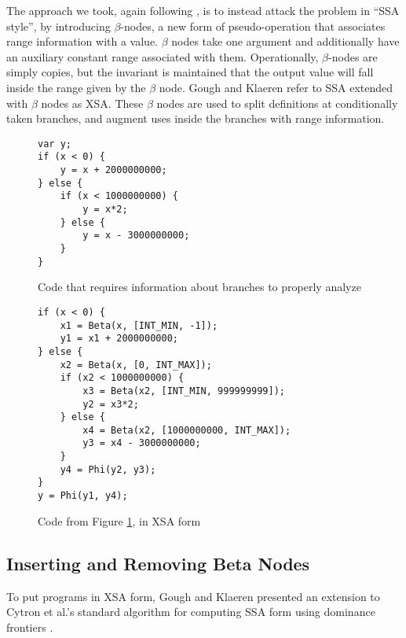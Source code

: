 \documentclass{article}
\begin{document}
The approach we took, again following \cite{Gough94eliminatingrange},
is to instead attack the problem in ``SSA style'', by introducing
$\beta$-nodes, a new form of pseudo-operation that associates range
information with a value. $\beta$ nodes take one argument and
additionally have an auxiliary constant range associated with
them. Operationally, $\beta$-nodes are simply copies, but the
invariant is maintained that the output value will fall inside the
range given by the $\beta$ node. Gough and Klaeren refer to SSA
extended with $\beta$ nodes as XSA. These $\beta$ nodes are used to split
definitions at conditionally taken branches, and augment uses inside the
branches with range information.

\begin{figure}[ht]
\begin{center}
\begin{verbatim}
var y;
if (x < 0) {
    y = x + 2000000000;
} else {
    if (x < 1000000000) {
        y = x*2;
    } else {
        y = x - 3000000000;
    }
}
\end{verbatim}
\end{center}
\caption{Code that requires information about branches to properly analyze}
\label{fig:branch}
\end{figure}

\begin{figure}[ht]
\begin{center}
\begin{verbatim}
if (x < 0) {
    x1 = Beta(x, [INT_MIN, -1]);
    y1 = x1 + 2000000000;
} else {
    x2 = Beta(x, [0, INT_MAX]);
    if (x2 < 1000000000) {
        x3 = Beta(x2, [INT_MIN, 999999999]);
        y2 = x3*2;
    } else {
        x4 = Beta(x2, [1000000000, INT_MAX]);
        y3 = x4 - 3000000000;
    }
    y4 = Phi(y2, y3);
}
y = Phi(y1, y4);
\end{verbatim}
\end{center}
\caption{Code from Figure \ref{fig:branch}, in XSA form}
\label{fig:xsa}
\end{figure}

\subsection{Inserting and Removing Beta Nodes}
To put programs in XSA form, Gough and Klaeren presented an extension
to Cytron et al.'s standard algorithm for computing SSA form using
dominance frontiers \cite{Cytron}.
\end{document}

